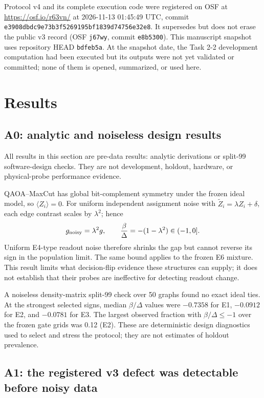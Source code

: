 \documentclass[10pt,twocolumn]{article}
\newcommand{\code}[1]{\texttt{#1}}
\begin{document}
Protocol v4 and its complete execution code were registered on OSF at
\url{https://osf.io/r63vn/} at 2026-11-13 01:45:49 UTC, commit
\code{e3908dbdc9e73b3f5269195bf1839d74756e32e8}. It supersedes but does not
erase the public v3 record (OSF \code{j67wy}, commit \code{e8b5300}). This
manuscript snapshot uses repository HEAD \code{bdfeb5a}. At the snapshot date,
the Task 2-2 development computation had been executed but its outputs were not
yet validated or committed; none of them is opened, summarized, or used here.

\section{Results}

\subsection{A0: analytic and noiseless design results}

All results in this section are pre-data results: analytic derivations or
split-99 software-design checks. They are not development, holdout, hardware,
or physical-probe performance evidence.

QAOA--MaxCut has global bit-complement symmetry under the frozen ideal model,
so $\langle Z_i\rangle=0$. For uniform independent assignment noise with
$\widetilde Z_i=\lambda Z_i+\delta$, each edge contrast scales by $\lambda^2$;
hence
\begin{equation}
  g_{\rm noisy}=\lambda^2 g,\qquad
  \frac{\beta}{\Delta}=-(1-\lambda^2)\in(-1,0].
  \label{eq:readoutscale}
\end{equation}
Uniform E4-type readout noise therefore shrinks the gap but cannot reverse its
sign in the population limit. The same bound applies to the frozen E6 mixture.
This result limits what decision-flip evidence these structures can supply; it
does not establish that their probes are ineffective for detecting readout
change.

A noiseless density-matrix split-99 check over 50 graphs found no exact ideal
ties. At the strongest selected signs, median $\beta/\Delta$ values were
$-0.7358$ for E1, $-0.0912$ for E2, and $-0.0781$ for E3. The largest observed
fraction with $\beta/\Delta\le-1$ over the frozen gate grids was 0.12 (E2).
These are deterministic design diagnostics used to select and stress the
protocol; they are not estimates of holdout prevalence.

\subsection{A1: the registered v3 defect was detectable before noisy data}
\end{document}
